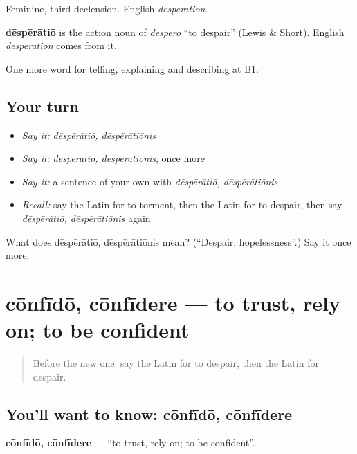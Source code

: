 Feminine, third declension. English \emph{desperation}.

\begin{cousinweb}
\textbf{dēspērātiō} is the action noun of \emph{dēspērō} \textquotedblleft{}to despair\textquotedblright{} (Lewis \& Short). English \emph{desperation} comes from it.
\end{cousinweb}

\begin{grammarlens}[title={What you've built}]
One more word for telling, explaining and describing at B1.
\end{grammarlens}

\subsection*{Your turn}
\begin{itemize}
\raggedright
  \item \emph{Say it:} \emph{dēspērātiō, dēspērātiōnis}
  \item \emph{Say it:} \emph{dēspērātiō, dēspērātiōnis}, once more
  \item \emph{Say it:} a sentence of your own with \emph{dēspērātiō, dēspērātiōnis}
  \item \emph{Recall:} say the Latin for to torment, then the Latin for to despair, then say \emph{dēspērātiō, dēspērātiōnis} again
\end{itemize}

\begin{tcolorbox}[breakable,colback=teal!4,colframe=teal!35!black,title={Before you move on}]
What does dēspērātiō, dēspērātiōnis mean? (\textquotedblleft{}Despair, hopelessness\textquotedblright{}.) Say it once more.
\end{tcolorbox}
\section[cōnfīdō, cōnfīdere]{cōnfīdō, cōnfīdere — to trust, rely on; to be confident}

\label{lesson:LA-C498-confido}



\begin{quote}
Before the new one: say the Latin for to despair, then the Latin for despair.
\end{quote}

\subsection*{You'll want to know: cōnfīdō, cōnfīdere}
\textbf{cōnfīdō, cōnfīdere} — \textquotedblleft{}to trust, rely on; to be confident\textquotedblright{}.

